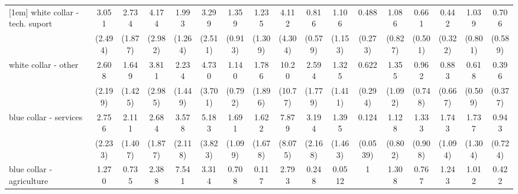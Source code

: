 {\begin{tabular}{l*{16}{c}}
[1em]
white collar - tech. suport&       3.051         &       2.734         &       4.174\sym{*}  &       1.993         &       3.299         &       1.359         &       1.235         &       4.112         &       0.816         &       1.106         &       0.488         &       1.086         &       0.661         &       0.442         &       1.039         &       0.706         \\
                    &     (2.494)         &     (1.877)         &     (2.982)         &     (1.264)         &     (2.511)         &     (0.913)         &     (1.309)         &     (4.304)         &     (0.579)         &     (1.153)         &     (0.273)         &     (0.827)         &     (0.501)         &     (0.322)         &     (0.801)         &     (0.589)         \\
[1em]
white collar - other&       2.608         &       1.649         &       3.811         &       2.234         &       4.730\sym{*}  &       1.140         &       1.786         &       10.20\sym{*}  &       2.594         &       1.325         &       0.622         &       1.355         &       0.962         &       0.883         &       0.618         &       0.396         \\
                    &     (2.199)         &     (1.425)         &     (2.985)         &     (1.449)         &     (3.701)         &     (0.792)         &     (1.896)         &     (10.77)         &     (1.779)         &     (1.411)         &     (0.294)         &     (1.092)         &     (0.748)         &     (0.667)         &     (0.509)         &     (0.377)         \\
[1em]
blue collar - services&       2.756         &       2.111         &       2.684         &       3.578\sym{*}  &       5.183\sym{*}  &       1.691         &       1.622         &       7.879\sym{*}  &       3.194         &       1.395         &       0.124\sym{***}&       1.128         &       1.333         &       1.743         &       1.737         &       0.943         \\
                    &     (2.233)         &     (1.407)         &     (1.877)         &     (2.118)         &     (3.823)         &     (1.099)         &     (1.678)         &     (8.075)         &     (2.168)         &     (1.463)         &    (0.0539)         &     (0.802)         &     (0.908)         &     (1.094)         &     (1.304)         &     (0.724)         \\
[1em]
blue collar - agriculture&       1.270         &       0.735         &       2.388         &       7.541\sym{**} &       3.314         &       0.708         &       0.117         &       2.793         &       0.248         &      0.0512\sym{*}  &           1         &       1.308         &       0.767         &       1.243         &       1.012         &       0.422         \\

\end{tabular}}
